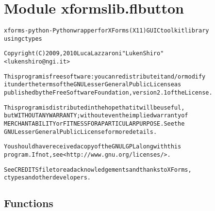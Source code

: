 %
%
%


\section{Module xformslib.flbutton}

    \label{xformslib:flbutton}
\begin{alltt}

xforms-python - Python wrapper for XForms (X11) GUI C toolkit library
using ctypes

Copyright (C) 2009, 2010  Luca Lazzaroni "LukenShiro"
    {\textless}lukenshiro@ngi.it{\textgreater}

This program is free software: you can redistribute it and/or modify
it under the terms of the GNU Lesser General Public License as
published by the Free Software Foundation, version 2.1 of the License.

This program is distributed in the hope that it will be useful,
but WITHOUT ANY WARRANTY; without even the implied warranty of
MERCHANTABILITY or FITNESS FOR A PARTICULAR PURPOSE. See the
GNU Lesser General Public License for more details.

You should have received a copy of the GNU LGPL along with this
program. If not, see {\textless}http://www.gnu.org/licenses/{\textgreater}.

See CREDITS file to read acknowledgements and thanks to XForms,
ctypes and other developers.
\end{alltt}



  \subsection{Functions}

    \label{xformslib:flbutton:fl_add_roundbutton}

